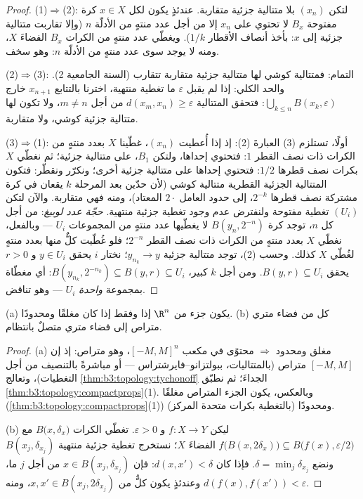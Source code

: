 \begin{proof}
(1)$\Rightarrow$(2): لتكن $(x_n)$ بلا متتالية جزئية متقاربة.
عندئذٍ يكون لكل $x \in X$ كرة مفتوحة $B_x$ لا تحتوي على $x_n$
إلا من أجل عدد منتهٍ من الأدلّة $n$ (وإلا تقاربت متتالية جزئية
إلى $x$: بأخذ أنصاف الأقطار $1/k$). ويغطّي عدد منتهٍ من الكرات
$B_x$ الفضاءَ $X$، ومنه لا يوجد سوى عدد منتهٍ من الأدلّة $n$:
وهو سخف.

(2)$\Rightarrow$(3): التمام: فمتتالية كوشي لها متتالية جزئية
متقاربة تتقارب (السنة الجامعية 2). والحد الكلي: إذا لم يقبل
$\varepsilon$ ما تغطية منتهية، اخترنا بالتتابع $x_{n+1}$ خارج
$\bigcup_{k\leq n} B(x_k, \varepsilon)$: فتحقق المتتالية $d(x_m, x_n) \geq \varepsilon$ من أجل $m \neq n$، ولا تكون لها
متتالية جزئية كوشي، ولا متقاربة.

(3)$\Rightarrow$(1): أولًا، تستلزم (3) العبارةَ (2): إذ إذا
أُعطيت $(x_n)$، غطّينا $X$ بعدد منتهٍ من الكرات ذات نصف القطر
$1$: فتحتوي إحداها، ولتكن $B_1$، على متتالية جزئية؛ ثم نغطّي
$X$ بكرات نصف قطرها $1/2$: فتحتوي إحداها على متتالية جزئية
أخرى؛ ونكرّر ونقطّر: فتكون المتتالية الجزئية القطرية متتالية
كوشي (لأن حدّين بعد المرحلة $k$ يقعان في كرة مشتركة نصف قطرها
$2^{-k}$، إلى حدود العامل $2\cdot$ المعتاد)، ومنه فهي متقاربة.
والآن لتكن $(U_i)$ تغطية مفتوحة ولنفترض عدم وجود تغطية جزئية
منتهية. \emph{حجّة عدد لوبيغ}: من أجل كل $n$، توجد كرة
$B(y_n, 2^{-n})$ لا يغطّيها عدد منتهٍ من المجموعات $U_i$ ---
وبالفعل، نغطّي $X$ بعدد منتهٍ من الكرات ذات نصف القطر $2^{-n}$؛
فلو غُطّيت كلٌّ منها بعدد منتهٍ لغُطّي $X$ كذلك. وحسب (2)، توجد
متتالية جزئية $y_{n_k} \to y$؛ نختار $i$ يحقق $y \in U_i$
و $r > 0$ يحقق $B(y, r) \subseteq U_i$. ومن أجل $k$ كبير، $B(y_{n_k}, 2^{-n_k}) \subseteq B(y, r) \subseteq U_i$: أي مغطّاة
بمجموعة \emph{واحدة} $U_i$ --- وهو تناقض.
\end{proof}

\begin{corollary}
\label{cor:b3:topology:heineborel}
(a) يكون جزء من $\R^n$  إذا وفقط إذا كان مغلقًا
ومحدودًا.
(b) كل  من فضاء متري متراص إلى فضاء متري متصلٌ
بانتظام.
\end{corollary}

\begin{proof}
(a) مغلق ومحدود $\Rightarrow$ محتوًى في مكعب $[-M,M]^n$، وهو
متراص: إذ إن $[-M, M]$ متراص (بالمتتاليات، ببولتزانو--فايرشتراس
--- أو مباشرةً بالتنصيف من أجل التغطيات)، وتعالج \cref{thm:b3:topology:tychonoff}
الجداءَ؛ ثم نطبّق \cref{thm:b3:topology:compactprops}(1). وبالعكس، يكون الجزء المتراص
مغلقًا (\cref{thm:b3:topology:compactprops}(1)) ومحدودًا (بالتغطية بكرات متحدة المركز).

(b) ليكن $f \colon X \to Y$ و $\varepsilon > 0$. تغطّي الكرات $B\bigl(x, \delta_x\bigr)$ مع $f\bigl(B(x,
2\delta_x)\bigr)\subseteq B\bigl(f(x), \varepsilon/2\bigr)$ الفضاءَ
$X$؛ نستخرج تغطية جزئية منتهية $B(x_j, \delta_{x_j})$ ونضع $\delta = \min_j \delta_{x_j}$. فإذا كان
$d(x, x') < \delta$: فإن $x
\in B(x_j, \delta_{x_j})$ من أجل $j$ ما، وعندئذٍ يكون كلٌّ من $x, x'
\in B(x_j, 2\delta_{x_j})$،
ومنه $d(f(x), f(x')) < \varepsilon$.
\end{proof}


